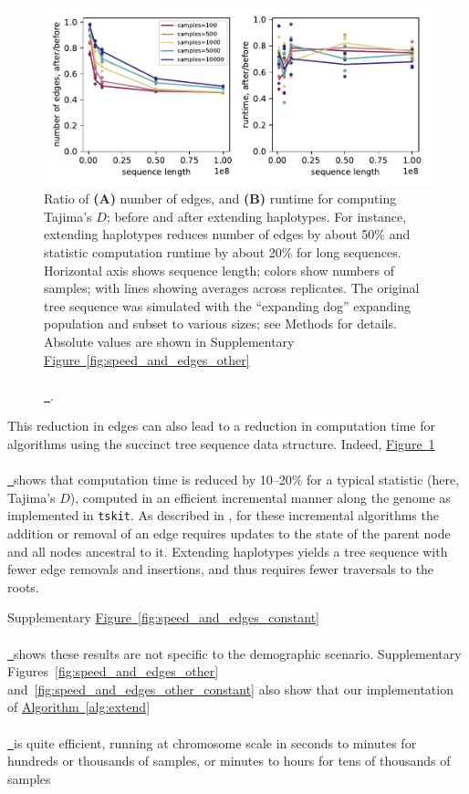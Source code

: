 \documentclass[10pt,twoside,lineno]{gsajnl}
\newcommand{\tskit}{\texttt{tskit}}
\newcommand{\algorithmref}[2][]{%
	\hyperref[{#2}]{%
		Algorithm~\ref*{#2}%
		\ifx\\#1\\%
		\else
		\,#1%
		\fi
	}%
}
\newcommand*{\figref}[2][]{%
	\hyperref[{#2}]{%
		Figure~\ref*{#2}%
		\ifx\\#1\\%
		\else
		\,#1%
		\fi
	}%
}
\begin{document}
\begin{figure}
    \centering
    \includegraphics{benchmarks/one_pop_results_ratios}
    \caption{
        Ratio of
        \textbf{(A)} number of edges, and
        \textbf{(B)} runtime for computing Tajima's $D$;
        before and after extending haplotypes.
        For instance, extending haplotypes reduces number of edges by about 50\%
        and statistic computation runtime by about 20\%
        for long sequences.
        Horizontal axis shows sequence length;
        colors show numbers of samples;
        with lines showing averages across replicates.
        The original tree sequence was simulated with the ``expanding dog'' expanding population
        and subset to various sizes;
        see Methods for details. 
        Absolute values are shown in Supplementary \figref{fig:speed_and_edges_other}.
        \label{fig:speed_and_edges}
    }
\end{figure}

This reduction in edges can also lead to a reduction in computation time for
algorithms using the succinct tree sequence data structure.
Indeed, \figref{fig:speed_and_edges} shows that computation time is reduced by 10--20\%
for a typical statistic (here, Tajima's $D$),
computed in an efficient incremental manner along the genome as implemented in \tskit.
As described in \citet{ralph2020efficiently}, for these incremental algorithms
the addition or removal of an edge requires updates
to the state of the parent node and all nodes ancestral to it.
Extending haplotypes yields a tree sequence with fewer edge removals and insertions, 
and thus requires fewer traversals to the roots.

Supplementary \figref{fig:speed_and_edges_constant} shows these results are not specific
to the demographic scenario.
Supplementary Figures~\ref{fig:speed_and_edges_other}
and~\ref{fig:speed_and_edges_other_constant}
also show that our implementation of \algorithmref{alg:extend} is quite efficient,
running at chromosome scale in seconds to minutes for hundreds or thousands of samples,
or minutes to hours for tens of thousands of samples
\end{document}
